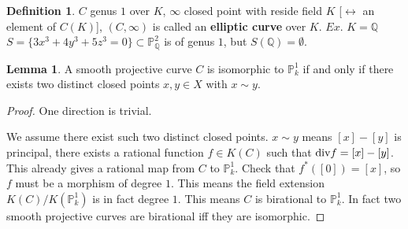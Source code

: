 \documentclass[11pt]{article}
\theoremstyle{definition}
\newtheorem{lemma}[thm]{Lemma}
\newtheorem{dfn}[thm]{Definition}
\newcommand{\proj}{\mathbb P}
\newcommand{\ratl}{\mathbb Q}
\renewcommand{\div}{\textnormal{div}}
\newcommand{\llrta}{\longleftrightarrow}
\begin{document}
\begin{dfn}
 $C$ genus $1$ over $K$, $\infty$ closed point with reside field $K$ [$\llrta$ an  element of $C(K)$], $(C,\infty)$ is called an \textbf{elliptic curve} over $K$. $Ex$. $K=\ratl$ $S=\{3x^3+4y^3+5z^3=0\}\subset \proj^2_\ratl$  is of genus $1$, but $S(\ratl)=\emptyset$.
\end{dfn}
\begin{lemma}
A smooth projective curve  $C$ is isomorphic to $\proj^1_k$ if and only if there exists two distinct closed points $x,y\in X$ with $x\sim y$.
\end{lemma}
\begin{proof}
One direction is trivial.

We assume there exist such two distinct closed points. $x\sim y$ means $[x]-[y]$ is principal, there exists a rational function $f\in K(C)$ such that $\div f=[x]-[y]$.  This already gives a rational map from $C$ to $\proj^1_k$. Check that $f^*([0])=[x]$, so $f$ must be a morphism of degree $1$. This means the field extension $K(C)/K(\proj^1_k)$ is in fact degree $1$. This means $C$ is birational to $\proj^1_k$. In fact two smooth projective  curves are birational iff they are isomorphic.
\end{proof}
\end{document}
